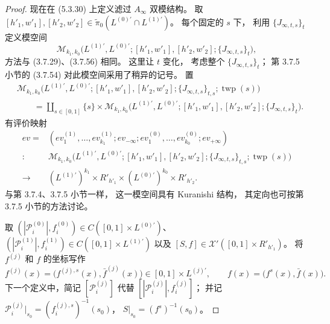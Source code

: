 \begin{proof}
现在在 (5.3.30) 上定义滤过
$A_\infty$ 双模结构。
取
$[h'_1,w'_1],[h'_2,w'_2]
\in\widetilde\pi_0
(L^{(0)\prime}\cap L^{(1)\prime})$。
每个固定的 $s$ 下，
利用 $\{J_{\infty,t,s}\}_t$
定义模空间
\[
\mathcal M_{k_1,k_0}
\bigl(L^{(1)\prime},L^{(0)\prime};
[h'_1,w'_1],[h'_2,w'_2];
\{J_{\infty,t,s}\}_t\bigr),
\]
方法与 (3.7.29)、(3.7.56) 相同。
这里让 $t$ 变化，
考虑整个 $\{J_{\infty,t,s}\}_t$；
第 3.7.5 小节的 (3.7.54)
对此模空间采用了稍异的记号。
置
\begin{equation}
\begin{aligned}
&\mathcal M_{k_1,k_0}
\bigl(L^{(1)\prime},L^{(0)\prime};
[h'_1,w'_1],[h'_2,w'_2];
\{J_{\infty,t,s}\}_{t,s};
\operatorname{twp}(s)\bigr)\\
&\qquad=
\coprod_{s\in[0,1]}
\{s\}\times
\mathcal M_{k_1,k_0}
\bigl(L^{(1)\prime},L^{(0)\prime};
[h'_1,w'_1],[h'_2,w'_2];
\{J_{\infty,t,s}\}_t\bigr).
\end{aligned}
\tag{5.3.31}\label{eq:5-3-31}
\end{equation}
有评价映射
\begin{equation}
\begin{aligned}
ev={}&
(ev^{(1)}_1,\ldots,ev^{(1)}_{k_1};
ev_{-\infty};
ev^{(0)}_1,\ldots,ev^{(0)}_{k_0};
ev_{+\infty})\\
\colon&
\mathcal M_{k_1,k_0}
\bigl(L^{(1)\prime},L^{(0)\prime};
[h'_1,w'_1],[h'_2,w'_2];
\{J_{\infty,t,s}\}_{t,s};
\operatorname{twp}(s)\bigr)\\
\longrightarrow{}&
(L^{(1)\prime})^{k_1}
\times R'_{h'_1}
\times(L^{(0)\prime})^{k_0}
\times R'_{h'_2}.
\end{aligned}
\tag{5.3.32}\label{eq:5-3-32}
\end{equation}
与第 3.7.4、3.7.5 小节一样，
这一模空间具有 Kuranishi 结构，
其定向也可按第 3.7.5 小节的方法讨论。

取
$(|\mathcal P_i^{(0)}|,f_i^{(0)})
\in C([0,1]\times L^{(0)\prime})$、
$(|\mathcal P_i^{(1)}|,f_i^{(1)})
\in C([0,1]\times L^{(1)\prime})$
以及
$[S,f]\in
\mathcal X'([0,1]\times R'_{h'_1})$。
将 $f^{(j)}$ 和 $f$ 的坐标写作
\[
f^{(j)}(x)=
\bigl(f^{(j),s}(x),\bar f^{(j)}(x)\bigr)
\in[0,1]\times L^{(j)\prime},
\qquad
f(x)=\bigl(f^s(x),\bar f(x)\bigr).
\]
下一个定义中，简记
$[\mathcal P_i^{(j)}]$
代替
$[|\mathcal P_i^{(j)}|,f_i^{(j)}]$；
并记
$\mathcal P_i^{(j)}|_{s_0}
=(f_i^{(j),s})^{-1}(s_0)$，
$S|_{s_0}=(f^s)^{-1}(s_0)$。


\end{proof}

